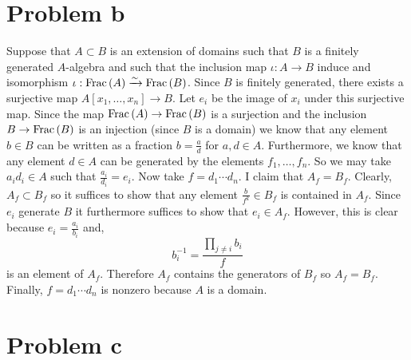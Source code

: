 \documentclass[12pt]{article}
\begin{document}
\section{Problem b}

Suppose that $A \subset B$ is an extension of domains such that $B$ is a finitely generated $A$-algebra and such that the inclusion map $\iota : A \to B$ induce and isomorphism $\iota : \mathrm{Frac}\left(A\right) \xrightarrow{\sim} \mathrm{Frac}\left(B\right)$. Since $B$ is finitely generated, there exists a surjective map $A[x_1, \dots, x_n] \to B$. Let $e_i$ be the image of $x_i$ under this surjective map. Since the map $\mathrm{Frac}\left(A\right) \to \mathrm{Frac}\left(B\right)$ is a surjection and the inclusion $B \to \mathrm{Frac}\left(B\right)$ is an injection (since $B$ is a domain) we know that any element $b \in B$ can be written as a fraction $b = \frac{a}{d}$ for $a,d \in A$. Furthermore, we know that any element $d \in A$ can be generated by the elements $f_1, \dots, f_n$. So we may take $a_i d_i \in A$ such that $\frac{a_i}{d_i} = e_i$. Now take $f = d_1 \cdots d_n$. I claim that $A_f = B_f$. Clearly, $A_f \subset B_f$ so it suffices to show that any element $\frac{b}{f^k} \in B_f$ is contained in $A_f$. Since $e_i$ generate $B$ it furthermore suffices to show that $e_i \in A_f$. However, this is clear because $e_i = \frac{a_i}{b_i}$ and,
\[ b_i^{-1} = \frac{\prod\limits_{j \neq i} b_i}{f} \]
is an element of $A_f$. Therefore $A_f$ contains the generators of $B_f$ so $A_f = B_f$. Finally, $f = d_1 \cdots d_n$ is nonzero because $A$ is a domain. 

\section{Problem c}
\end{document}

